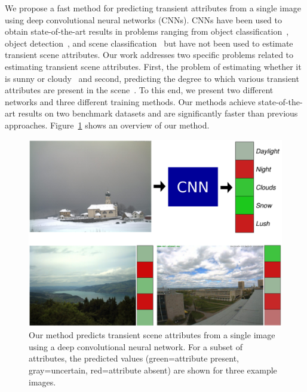 \documentclass[10pt,twocolumn,letterpaper]{article}
\newcommand{\figref}[1]{Figure~\ref{fig:#1}}
\begin{document}

We propose a fast method for predicting transient attributes from a single
image using deep convolutional neural networks (CNNs). CNNs have been used to
obtain state-of-the-art results in problems ranging from object
classification~\cite{krizhevsky2012imagenet}, object
detection~\cite{girshick2013rich}, and scene
classification~\cite{zhou2014places} but have not been used to estimate
transient scene attributes. Our work addresses two specific problems related to
estimating transient scene attributes. First, the problem of estimating whether
it is sunny or cloudy~\cite{lutwoclass} and second, predicting the degree to
which various transient attributes are present in the scene~\cite{Laffont14}.
To this end, we present two different networks and three different training
methods. Our methods achieve state-of-the-art results on two benchmark
datasets and are significantly faster than previous approaches.  \figref{cartoon} shows an
overview of our method.  



\begin{figure}[t]
	\centering
		\includegraphics[width=\linewidth, trim= 0mm 0mm 0mm 0mm]{figs/cartoon.pdf}
    \caption{Our method predicts transient scene attributes from a
      single image using a deep convolutional neural network. For a
      subset of attributes, the predicted values (green=attribute
      present, gray=uncertain, red=attribute absent) are shown for
      three example images. 
    }
		\label{fig:cartoon}
\end{figure}
\end{document}

